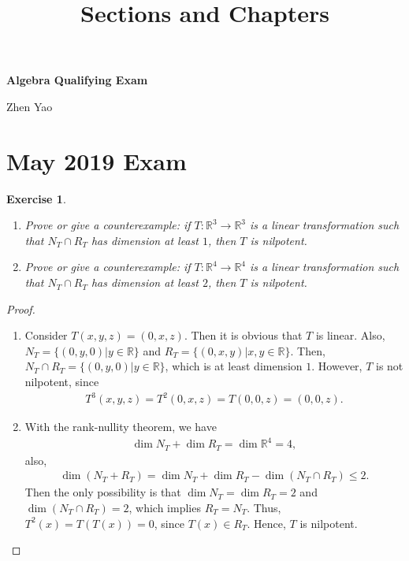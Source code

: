 \documentclass[11pt]{article}
\title{Sections and Chapters}
\newtheorem{exercise}{Exercise}[section]
\theoremstyle{definition}
\numberwithin{equation}{subsection}
\begin{document}
\centerline{\Large \bf Algebra Qualifying Exam}
\centerline{Zhen Yao}

\bigskip

\section{May 2019 Exam}

\begin{exercise}
~\begin{enumerate}[label=(\alph*)]
    \item Prove or give a counterexample: if $T: \mathbb{R}^3 \to \mathbb{R}^3$ is a linear transformation such that $N_T \cap R_T$ has dimension at least $1$, then $T$ is nilpotent. 
    
    \item Prove or give a counterexample: if $T: \mathbb{R}^4 \to \mathbb{R}^4$ is a linear transformation such that $N_T \cap R_T$ has dimension at least $2$, then $T$ is nilpotent. 
\end{enumerate}
\end{exercise}
\begin{proof}
~\begin{enumerate}[label=(\alph*)]
    \item Consider $T(x,y,z) = (0,x,z)$\cite{1}. Then it is obvious that $T$ is linear. Also, $N_T = \{(0,y,0)| y \in \mathbb{R}\}$ and $R_T = \{(0,x,y)| x,y \in \mathbb{R}\}$. Then, $N_T \cap R_T = \{(0,y,0)| y \in \mathbb{R}\}$, which is at least dimension $1$. However, $T$ is not nilpotent, since 
    \begin{align*}
        T^3(x,y,z) = T^2(0,x,z) = T(0,0,z) = (0,0,z).
    \end{align*}
    
    \item With the rank-nullity theorem, we have 
    \begin{align*}
        \dim N_T + \dim R_T = \dim \mathbb{R}^4 = 4,
    \end{align*}
    also, 
    \begin{align*}
        \dim (N_T + R_T) = \dim N_T + \dim R_T - \dim (N_T \cap R_T) \leq 2.
    \end{align*}
    Then the only possibility is that $\dim N_T = \dim R_T = 2$ and $\dim (N_T \cap R_T) = 2$, which implies $R_T = N_T$\cite{2}. Thus, $T^2(x) = T(T(x)) = 0$, since $T(x) \in R_T$. Hence, $T$ is nilpotent.
\end{enumerate}
\end{proof}
\end{document}
